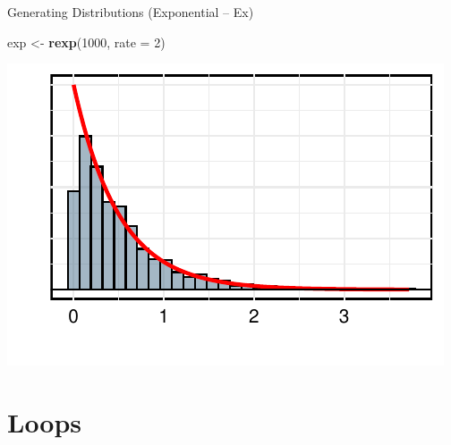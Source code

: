 \documentclass[
  ignorenonframetext,
]{beamer}
\newenvironment{Shaded}{\begin{snugshade}}{\end{snugshade}}
\newcommand{\AttributeTok}[1]{\textcolor[rgb]{0.13,0.29,0.53}{#1}}
\newcommand{\DecValTok}[1]{\textcolor[rgb]{0.00,0.00,0.81}{#1}}
\newcommand{\FunctionTok}[1]{\textcolor[rgb]{0.13,0.29,0.53}{\textbf{#1}}}
\newcommand{\NormalTok}[1]{#1}
\newcommand{\OtherTok}[1]{\textcolor[rgb]{0.56,0.35,0.01}{#1}}
\begin{document}
\begin{frame}[fragile]{Generating Distributions (Exponential -- Ex)}
\label{generating-distributions-exponential-ex-1}
\begin{Shaded}
\begin{Highlighting}[]
\NormalTok{exp }\OtherTok{\textless{}{-}} \FunctionTok{rexp}\NormalTok{(}\DecValTok{1000}\NormalTok{, }\AttributeTok{rate =} \DecValTok{2}\NormalTok{)}
\end{Highlighting}
\end{Shaded}

\begin{center}\includegraphics{Class_2_Intermediate_R_Programming_files/figure-beamer/rexp_ex_figure-1} \end{center}
\end{frame}

\section{Loops}\label{loops}
\end{document}
